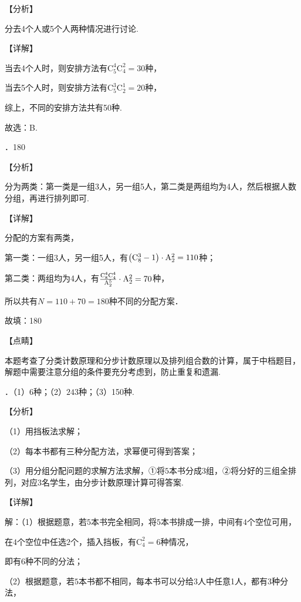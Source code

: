 \noindent 【分析】

\noindent 分去4个人或5个人两种情况进行讨论.

\noindent 【详解】

\noindent 当去4个人时，则安排方法有$\mathrm C_{5}^{4} \mathrm C_{4}^{2} =30$种，

\noindent 当去5个人时，则安排方法有$\mathrm C_{5}^{3} \mathrm C_{2}^{1} =20$种，

\noindent 综上，不同的安排方法共有50种.

\noindent 故选：B.

．180

\noindent 【分析】

\noindent 分为两类：第一类是一组3人，另一组5人，第二类是两组均为4人，然后根据人数分组，再进行排列即可.

\noindent 【详解】

\noindent 分配的方案有两类，

\noindent 第一类：一组3人，另一组5人，有$\left({\rm C}_{8}^{3} -1\right)\cdot {\rm A}_{2}^{2} =110$种；

\noindent 第二类：两组均为4人，有$\frac{{\rm C}_{8}^{4} {\rm C}_{4}^{4} }{{\rm A}_{2}^{5} } \cdot {\rm A}_{2}^{2} =70$种，

\noindent 所以共有$N=110+70=180$种不同的分配方案．

\noindent 故填：180

\noindent 【点睛】

\noindent 本题考查了分类计数原理和分步计数原理以及排列组合数的计算，属于中档题目，解题中需要注意分组的条件要充分考虑到，防止重复和遗漏.

．（1）$6$种；（2）$243$种；（3）150种.

\noindent 【分析】

\noindent （1）用挡板法求解；

\noindent （2）每本书都有三种分配方法，求幂便可得到答案；

\noindent （3）用分组分配问题的求解方法求解，①将$5$本书分成$3$组，②将分好的三组全排列，对应3名学生，由分步计数原理计算可得答案.

\noindent 【详解】

\noindent 解：（1）根据题意，若$5$本书完全相同，将$5$本书排成一排，中间有$4$个空位可用，

\noindent 在$4$个空位中任选$2$个，插入挡板，有$\mathrm C_{4}^{2} =6$种情况，

\noindent 即有$6$种不同的分法；

\noindent （2）根据题意，若$5$本书都不相同，每本书可以分给$3$人中任意1人，都有3种分法，

